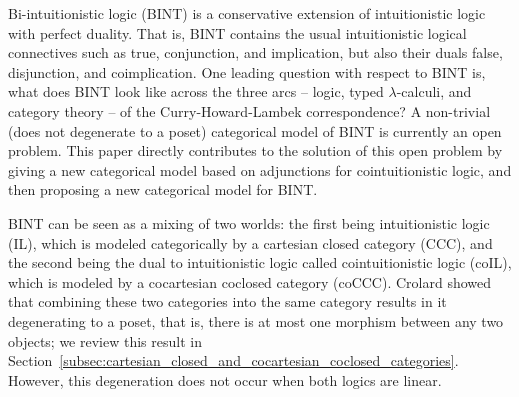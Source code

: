 Bi-intuitionistic logic (BINT) is a conservative extension of
intuitionistic logic with perfect duality.  That is, BINT contains the
usual intuitionistic logical connectives such as true, conjunction,
and implication, but also their duals false, disjunction, and
coimplication. One leading question with respect to BINT is, what does
BINT look like across the three arcs -- logic, typed
$\lambda$-calculi, and category theory -- of the Curry-Howard-Lambek
correspondence?  A non-trivial (does not degenerate to a poset)
categorical model of BINT is currently an open problem.  This paper
directly contributes to the solution of this open problem by giving a
new categorical model based on adjunctions for cointuitionistic logic,
and then proposing a new categorical model for BINT.  

BINT can be seen as a mixing of two worlds: the first being
intuitionistic logic (IL), which is modeled categorically by a
cartesian closed category (CCC), and the second being the dual to
intuitionistic logic called cointuitionistic logic (coIL), which is
modeled by a cocartesian coclosed category (coCCC).  Crolard
\cite{Crolard:2001} showed that combining these two categories into
the same category results in it degenerating to a poset, that is,
there is at most one morphism between any two objects; we review this
result in
Section~\ref{subsec:cartesian_closed_and_cocartesian_coclosed_categories}.
However, this degeneration does not occur when both logics are linear.

